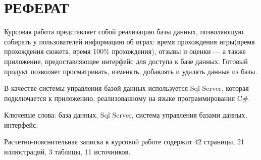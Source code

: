 \chapter*{РЕФЕРАТ}

Курсовая работа представляет собой реализацию базы данных, позволяющую собирать у пользователей информацию об играх: время прохождения игры(время прохождения сюжета, время 100\% прохождения),
отзывы и оценки --- а также приложение, предоставляющее интерфейс для доступа к базе данных. Готовый продукт позволяет просматривать, изменять, добавлять и удалять данные из базы.


В качестве системы управления базой данных используется Sql Server, которая подключается к приложению, реализованному на языке программирования C\#.

Ключевые слова: база данных, Sql Server, система управления базами данных, интерфейс.

Расчетно-пояснительная записка к курсовой работе содержит 42 страницы, 21 иллюстраций, 3 таблицы, 11 источников.




